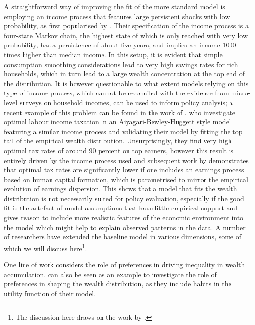 A straightforward way of improving the fit of the more standard model is employing an
income process that features large persistent shocks with low probability, as 
first popularised by \citet{CastanedaRiosRull2003}. Their specification of the 
income process is a four-state Markov chain, the highest state of which is only
reached with very low probability, has a persistence of about five years, and
implies an income 1000 times higher than median income. In this setup, it is evident
that simple consumption smoothing considerations lead to very high savings rates
for rich households, which in turn lead to a large wealth concentration at the 
top end of the distribution. It is however questionable to what extent models 
relying on this type of income process, which cannot be reconciled with the 
evidence from micro-level surveys on household incomes, can be used to inform 
policy analysis; a recent example of this problem can be found in the work of 
\cite{KindermannKrueger2014}, who investigate optimal labour income taxation
in an Aiyagari-Bewley-Huggett style model featuring a similar income process and
validating their model by fitting the top tail of the empirical wealth distribution.
Unsurprisingly, they find very high optimal tax rates of around 90 percent on 
top earners, however this result is entirely driven by the income process used
and subsequent work by \cite{BadelHuggett2014} demonstrates that optimal tax
rates are significantly lower if one includes an earnings process based on 
human capital formation, which is parametrised to mirror the empirical evolution
of earnings dispersion.
This shows that a model that fits the wealth distribution is not necessarily 
suited for policy evaluation, especially if the good fit is the artefact of
model assumptions that have little empirical support and gives reason to 
include more realistic features of the economic environment into the model 
which might help to explain observed patterns in the data. A number of researchers
have extended the baseline model in various dimensions, some of which we will 
discuss here\footnote{The discussion here draws on the work by \cite{DeNardi2015}.}.

One line of work considers the role of preferences in driving inequality in 
wealth accumulation. 
\citet{DPMRR2003} can also be seen as an example to investigate the role of 
preferences in shaping the wealth distribution, as they include habits in the 
utility function of their model. 

